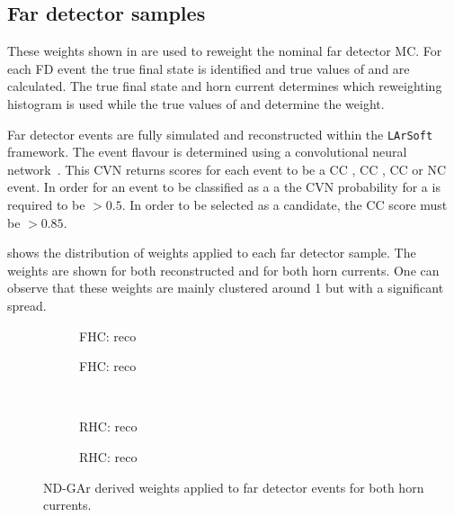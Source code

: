 \subsection{Far detector samples}
\label{sec:dune_ndrwt:rwt:fd}

These weights shown in  are used to reweight the nominal far detector MC.
For each FD event the true final state is identified and true values of \evis and \pvis are calculated.
The true final state and horn current determines which reweighting histogram is used while the true values of \evis and \pvis determine the weight.

Far detector events are fully simulated and reconstructed within the \texttt{LArSoft}~\cite{larsoft} framework.
The event flavour is determined using a convolutional neural network~\cite{duneCVN}.
This CVN returns scores for each event to be a CC \numu, CC \nue, CC \nutau or NC event.
In order for an event to be classified as a \numu a the CVN probability for a \numu is required to be $>0.5$. 
In order to be selected as a \nue candidate, the CC \nue score must be $>0.85$. 

 shows the distribution of weights applied to each far detector sample.
The weights are shown for both reconstructed \numu and \nue for both horn currents.
One can observe that these weights are mainly clustered around 1 but with a significant spread.

\begin{figure}[h]
	\begin{subfigure}[t]{.5\linewidth}
		\begin{adjustbox}{max totalsize=\linewidth, center}
			
		\end{adjustbox}
		\caption{FHC: reco \numu}
	\end{subfigure}
	\hfill
	\begin{subfigure}[t]{.5\linewidth}
		\begin{adjustbox}{max totalsize=\linewidth, center}
			
		\end{adjustbox}
		\caption{FHC: reco \nue}
	\end{subfigure}	\\
	\begin{subfigure}[t]{.5\linewidth}
		\begin{adjustbox}{max totalsize=\linewidth, center}
			
		\end{adjustbox}
		\caption{RHC: reco \numu}
	\end{subfigure}
	\hfill
	\begin{subfigure}[t]{.5\linewidth}
		\begin{adjustbox}{max totalsize=\linewidth, center}
			
		\end{adjustbox}
		\caption{RHC: reco \nue}
	\end{subfigure}
	\caption[ND-GAr derived weights applied to far detector events]{ND-GAr derived weights applied to far detector events for both horn currents.}
	\label{fig:fdWeights}
\end{figure}

